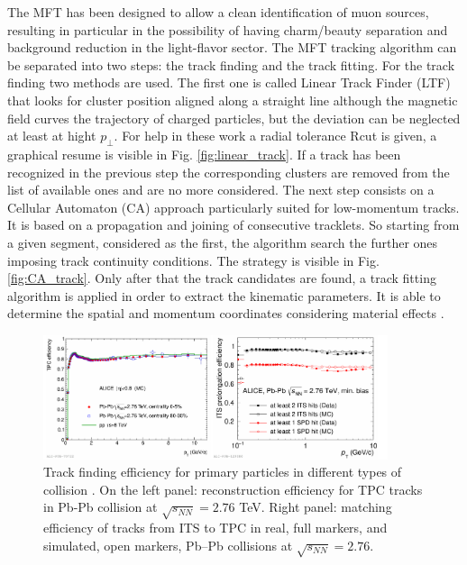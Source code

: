 \documentclass[12pt,a4paper]{book}
\begin{document}
 The MFT has been designed to allow a clean identification of muon sources, resulting in particular in the possibility of having charm/beauty separation and background reduction in the light-flavor sector. The MFT tracking algorithm can be separated into two steps: the track finding and the track fitting. For the track finding two methods are used. The first one is called Linear Track Finder (LTF) that looks for cluster position aligned along a straight line although the magnetic field curves the trajectory of charged particles, but the deviation can be neglected at least at hight $p_\perp$. For help in these work a radial tolerance Rcut is given, a graphical resume is visible in Fig. \ref{fig:linear_track}. If a track has been recognized in the previous step the corresponding clusters are removed from the list of available ones and are no more considered. The next step consists on a Cellular Automaton (CA) approach particularly suited for low-momentum tracks. It is based on a propagation and joining of consecutive tracklets. So starting from a given segment, considered as the first, the algorithm search the further ones imposing track continuity conditions. The strategy is visible in Fig. \ref{fig:CA_track}. Only after that the track candidates are found, a track fitting algorithm is applied in order to extract the kinematic parameters. It is able to determine the spatial and momentum coordinates considering material effects \cite{Herrmann:2920632}.
 
 \begin{figure}[h]
 	\centering
 	\includegraphics[width=0.9\textwidth]{pictures/track_finding_efficiency.png}
 	\caption{Track finding efficiency for primary particles in different types of collision \cite{ALICE:2014sbxFs}. On the left panel: reconstruction efficiency for TPC tracks in Pb-Pb collision at $\sqrt{s_{NN}} = 2.76$ TeV. Right panel: matching efficiency of tracks from ITS to TPC in real, full markers, and simulated, open markers, Pb–Pb collisions at $\sqrt{s_{NN}} = 2.76$.}
 	\label{fig:track_finding_efficiency}
 \end{figure}
 
\end{document}
